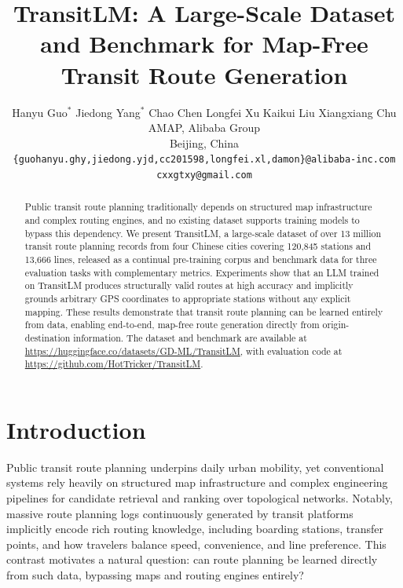 \documentclass{article}
\title{TransitLM: A Large-Scale Dataset and Benchmark for Map-Free Transit Route Generation}
\author{%
  Hanyu Guo$^{*}$ \quad Jiedong Yang$^{*}$ \quad Chao Chen \quad Longfei Xu \quad Kaikui Liu \quad Xiangxiang Chu \\[0.5em]
  AMAP, Alibaba Group\\
  Beijing, China\\[0.3em]
  \texttt{\{guohanyu.ghy,jiedong.yjd,cc201598,longfei.xl,damon\}@alibaba-inc.com}\\
  \texttt{cxxgtxy@gmail.com}
}
\begin{document}
\renewcommand{\thefootnote}{*}

\maketitle

\begin{abstract}
    Public transit route planning traditionally depends on structured map infrastructure and complex routing engines, and no existing dataset supports training models to bypass this dependency. We present TransitLM, a large-scale dataset of over 13 million transit route planning records from four Chinese cities covering 120,845 stations and 13,666 lines, released as a continual pre-training corpus and benchmark data for three evaluation tasks with complementary metrics. Experiments show that an LLM trained on TransitLM produces structurally valid routes at high accuracy and implicitly grounds arbitrary GPS coordinates to appropriate stations without any explicit mapping. These results demonstrate that transit route planning can be learned entirely from data, enabling end-to-end, map-free route generation directly from origin-destination information. The dataset and benchmark are available at \url{https://huggingface.co/datasets/GD-ML/TransitLM}, with evaluation code at \url{https://github.com/HotTricker/TransitLM}.
\end{abstract}

\section{Introduction}
\label{sec:introduction}
Public transit route planning underpins daily urban mobility, yet conventional systems rely heavily on structured map infrastructure and complex engineering pipelines for candidate retrieval and ranking over topological networks. Notably, massive route planning logs continuously generated by transit platforms implicitly encode rich routing knowledge, including boarding stations, transfer points, and how travelers balance speed, convenience, and line preference. This contrast motivates a natural question: can route planning be learned directly from such data, bypassing maps and routing engines entirely?
\end{document}
